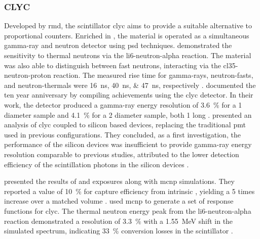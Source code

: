 \documentclass[../../../../main.tex]{subfiles}%
\begin{document}
%
    \subsubsection{CLYC}%
    \label{sec:chapter-2:scintillator-detectors:ceramics:clyc}%
    Developed by \gls{rmd}, the scintillator \gls{clyc} aims to provide a suitable alternative to  proportional counters.
    Enriched in , the material is operated as a simultaneous \gls{gamma-ray} and neutron detector using \gls{psd} techniques.
    \citeauthor*{DOlympia_2013} demonstrated the sensitivity to thermal neutrons via the \gls{li6-neutron-alpha} reaction.
    The material was also able to distinguish between fast neutrons, interacting via the \gls{cl35-neutron-proton} reaction.
    The measured rise time for \glspl{gamma-ray}, \glspl{neutron-fast}, and \glspl{neutron-thermal} were \SIlist{16; 40; 47}{\nano\second}, respectively \cite{DOlympia_2013}.
    \citeauthor*{Glodo_2013} documented the ten year anniversary by compiling achievements using the \gls{clyc} detector.
    In their work, the detector produced a \gls{gamma-ray} energy resolution of \SI{3.6}{\percent} for a \SI{1}{\inch} diameter sample and \SI{4.1}{\percent} for a \SI{2}{\inch} diameter sample, both \SI{1}{\inch} long \cite{Glodo_2013}.
    \citeauthor*{Smith_2013} presented an analysis of \gls{clyc} coupled to silicon based devices, replacing the traditional \gls{pmt} used in previous configurations.
    They concluded, as a first investigation, the performance of the silicon devices was insufficient to provide \gls{gamma-ray} energy resolution comparable to previous studies, attributed to the lower detection efficiency of the scintillation photons in the silicon devices \cite{Smith_2013}.
    \par%
    \citeauthor*{Bourne_2014} presented the results of  and  exposures along with \gls{mcnp} simulations.
    They reported a value of \SI{10}{\percent} for capture efficiency from intrinsic , yielding a \num{5} times increase over a matched  volume \cite{Bourne_2014}.
    \citeauthor*{Machrafi_2014} used \gls{mcnp} to generate a set of response functions for \gls{clyc}. 
    The thermal neutron energy peak from the \gls{li6-neutron-alpha} reaction demonstrated a resolution of \SI{3.3}{\percent} with a \SI{1.55}{\mega\electronvolt} shift in the simulated spectrum, indicating \SI{33}{\percent} conversion losses in the scintillator \cite{Machrafi_2014}.
\end{document}
